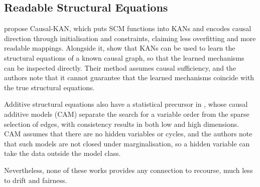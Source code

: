 \subsection{Readable Structural Equations}
\label{sec:lr-readable-structural-equations}
\citet{ma2025causal} propose Causal-KAN, which puts SCM functions into KANs and encodes causal direction through
initialisation and constraints, claiming less overfitting and more readable mappings. Alongside it,
\citet{almodovar2026kolmogorov} show that KANs can be used to learn the structural equations of a known causal
graph, so that the learned mechanisms can be inspected directly. Their method assumes causal sufficiency, and the
authors note that it cannot guarantee that the learned mechanisms coincide with the true structural equations.

Additive structural equations also have a statistical precursor in \citet{buhlmann2014cam}, whose causal additive
models (CAM) separate the search for a variable order from the sparse selection of edges, with consistency results
in both low and high dimensions. CAM assumes that there are no hidden variables or cycles, and the authors note that
such models are not closed under marginalisation, so a hidden variable can take the data outside the model class.

Nevertheless, none of these works provides any connection to recourse, much less to drift and fairness.

